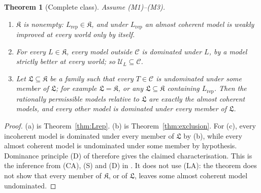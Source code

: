 \documentclass[11pt]{article}
\newcommand{\chg}[1]{{\color{red}#1}}
\newcommand{\chgb}[1]{{\color{violet}#1}}
\newtheorem{theorem}{Theorem}[section]
\theoremstyle{definition}
\theoremstyle{remark}
\newcommand{\C}{\mathcal C}
\newcommand{\U}{\mathcal U}
\newcommand{\K}{\mathfrak K}
\newcommand{\Lf}{\mathfrak L}
\newcommand{\Lrep}{L_{\mathrm{rep}}}
\begin{document}
\begin{theorem}[Complete class]\label{thm:main}
Assume (M1)--(M3).
\begin{enumerate}[label=(\alph*)]
\item $\K$ is nonempty: $\Lrep\in\K$, and under $\Lrep$ an almost coherent model is weakly improved at every world only by itself.
\item For every $L\in\K$, every model outside $\C$ is dominated under $L$, by a model strictly better at every world; so $\U_L\subseteq\C$.
\item Let $\Lf\subseteq\K$ be a family such that every $T\in\C$ is undominated under some member of $\Lf$; for example $\Lf=\K$, or any $\Lf\subseteq\K$ containing $\Lrep$. Then the rationally permissible models relative to $\Lf$ are exactly the almost coherent models, and every other model is dominated under every member of $\Lf$.
\end{enumerate}
\end{theorem}
\begin{proof}
(a) is Theorem~\ref{thm:Lrep}. (b) is Theorem~\ref{thm:exclusion}. \chg{For (c), every incoherent model is dominated under every member of $\Lf$ by (b), while every almost coherent model is undominated under some member by hypothesis. Dominance principle (D) of \cite[\S\ref{GR-sec:gen-dom}]{KonekGR} therefore gives the claimed characterisation.} \chgb{This is the inference from (CA), (S) and (D) in \cite[\S\ref{GR-sec:gen-dom}]{KonekGR}. It does not use (LA): the theorem does not show that every member of $\K$, or of $\Lf$, leaves some almost coherent model undominated.}
\end{proof}



\end{document}
